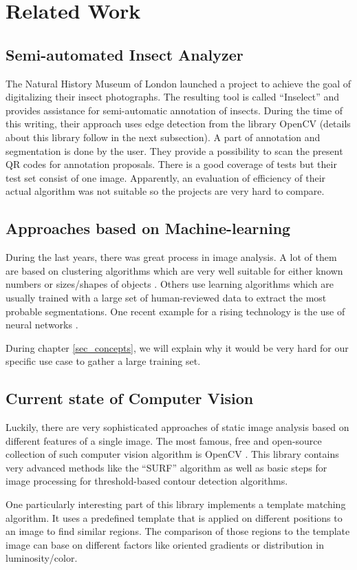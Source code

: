 %
\section{Related Work}
\label{sec_related}

\subsection{Semi-automated Insect Analyzer}

The Natural History Museum of London launched a project to achieve the goal of digitalizing their insect photographs. 
The resulting tool is called ``Inselect'' \cite{Inselect} and provides assistance for semi-automatic annotation of insects. 
During the time of this writing, their approach uses edge detection from the library OpenCV (details about this library follow in the next subsection).
A part of annotation and segmentation is done by the user. 
They provide a possibility to scan the present QR codes for annotation proposals.
There is a good coverage of tests but their test set consist of one image. 
Apparently, an evaluation of efficiency of their actual algorithm was not suitable so the projects are very hard to compare.

\subsection{Approaches based on Machine-learning}

During the last years, there was great process in image analysis. 
A lot of them are based on clustering algorithms which are very well suitable for either known numbers or sizes/shapes of objects \cite{Pappas}. 
Others use learning algorithms which are usually trained with a large set of human-reviewed data to extract the most probable segmentations.
One recent example for a rising technology is the use of neural networks \cite{turagal}.

During chapter \ref{sec_concepts}, we will explain why it would be very hard for our specific use case to gather a large training set.

\subsection{Current state of Computer Vision}

Luckily, there are very sophisticated approaches of static image analysis based on different features of a single image.
The most famous, free and open-source collection of such computer vision algorithm is OpenCV \cite{opencv_library}. 
This library contains very advanced methods like the ``SURF'' algorithm as well as basic steps for image processing for threshold-based contour detection algorithms.

One particularly interesting part of this library implements a template matching algorithm. 
It uses a predefined template that is applied on different positions to an image to find similar regions.
The comparison of those regions to the template image can base on different factors like oriented gradients or distribution in luminosity/color.